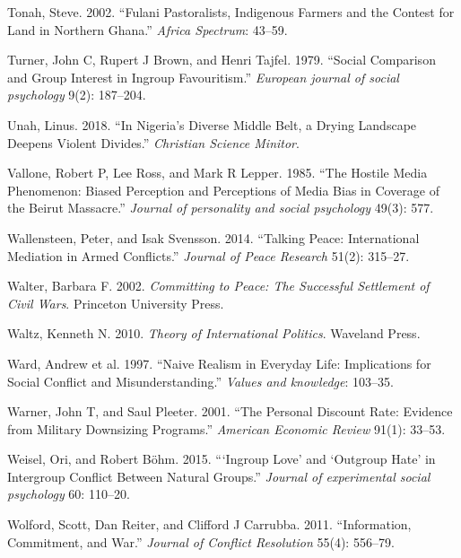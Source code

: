 \documentclass[11pt]{article}
\begin{document}
\leavevmode\hypertarget{ref-tonah2002fulani}{}%
Tonah, Steve. 2002. ``Fulani Pastoralists, Indigenous Farmers and the
Contest for Land in Northern Ghana.'' \emph{Africa Spectrum}: 43--59.

\leavevmode\hypertarget{ref-turner1979social}{}%
Turner, John C, Rupert J Brown, and Henri Tajfel. 1979. ``Social
Comparison and Group Interest in Ingroup Favouritism.'' \emph{European
journal of social psychology} 9(2): 187--204.

\leavevmode\hypertarget{ref-unah2018nigeria}{}%
Unah, Linus. 2018. ``In Nigeria's Diverse Middle Belt, a Drying
Landscape Deepens Violent Divides.'' \emph{Christian Science Minitor}.

\leavevmode\hypertarget{ref-vallone1985hostileMedia}{}%
Vallone, Robert P, Lee Ross, and Mark R Lepper. 1985. ``The Hostile
Media Phenomenon: Biased Perception and Perceptions of Media Bias in
Coverage of the Beirut Massacre.'' \emph{Journal of personality and
social psychology} 49(3): 577.

\leavevmode\hypertarget{ref-wallensteen2014talking}{}%
Wallensteen, Peter, and Isak Svensson. 2014. ``Talking Peace:
International Mediation in Armed Conflicts.'' \emph{Journal of Peace
Research} 51(2): 315--27.

\leavevmode\hypertarget{ref-walter2002committing}{}%
Walter, Barbara F. 2002. \emph{Committing to Peace: The Successful
Settlement of Civil Wars}. Princeton University Press.

\leavevmode\hypertarget{ref-waltz2010theory}{}%
Waltz, Kenneth N. 2010. \emph{Theory of International Politics}.
Waveland Press.

\leavevmode\hypertarget{ref-ward1997naive}{}%
Ward, Andrew et al. 1997. ``Naive Realism in Everyday Life: Implications
for Social Conflict and Misunderstanding.'' \emph{Values and knowledge}:
103--35.

\leavevmode\hypertarget{ref-warner2001personal}{}%
Warner, John T, and Saul Pleeter. 2001. ``The Personal Discount Rate:
Evidence from Military Downsizing Programs.'' \emph{American Economic
Review} 91(1): 33--53.

\leavevmode\hypertarget{ref-weisel2015ingroup}{}%
Weisel, Ori, and Robert Böhm. 2015. ```Ingroup Love' and `Outgroup Hate'
in Intergroup Conflict Between Natural Groups.'' \emph{Journal of
experimental social psychology} 60: 110--20.

\leavevmode\hypertarget{ref-wolford2011information}{}%
Wolford, Scott, Dan Reiter, and Clifford J Carrubba. 2011.
``Information, Commitment, and War.'' \emph{Journal of Conflict
Resolution} 55(4): 556--79.
\end{document}
